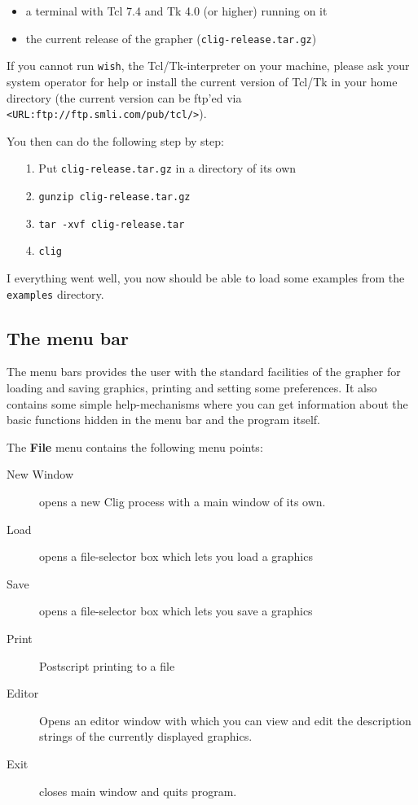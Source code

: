 \begin{itemize}
\item a terminal with Tcl 7.4 and Tk 4.0 (or higher) running on it
\item the current release of the grapher ({\tt clig-release.tar.gz})
\end{itemize}

If you cannot run {\tt wish}, the Tcl/Tk-interpreter on your machine,
please ask your system operator for help or install the current version
of Tcl/Tk in your home directory (the current version can be ftp'ed via
{\tt <URL:ftp://ftp.smli.com/pub/tcl/>}).

You then can do the following step by step:

\begin{itemize}
\item[1.] Put {\tt clig-release.tar.gz} in a directory of its own

\item[2.] {\tt gunzip clig-release.tar.gz}

\item[3.] {\tt tar -xvf clig-release.tar}

\item[4.] {\tt clig}
\end{itemize}

I everything went well, you now should be able to load some examples
from the {\tt examples} directory. 

\subsection{The menu bar}

The menu bars provides the user with the standard facilities of the
grapher for loading and saving graphics, printing and setting some
preferences. It also contains some simple help-mechanisms where you can
get information about the basic functions hidden in the menu bar and
the program itself. 

The {\bf File} menu contains the following menu points:

\begin{description}
\item[New Window] opens a new {\sc Clig} process with a main
window of its own.

\item[Load] opens a file-selector box which lets you load a graphics

\item[Save] opens a file-selector box which lets you save a graphics

\item[Print] Postscript printing to a file

\item[Editor] Opens an editor window with which you can view and edit 
the description strings of the currently displayed graphics.

\item[Exit] closes main window and quits program.

\end{description}

